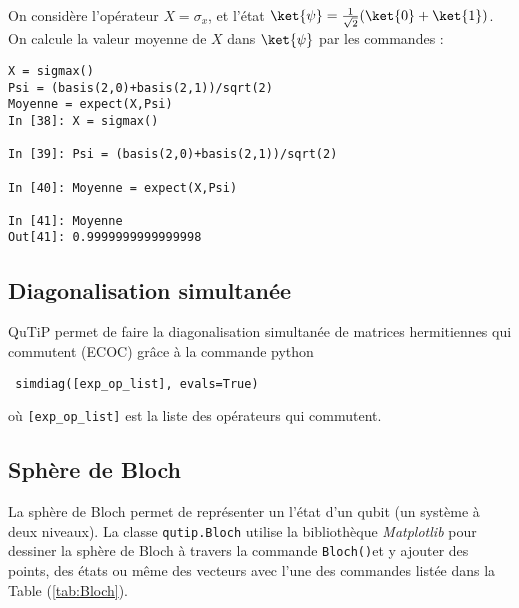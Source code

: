 \begin{example}
On considère l'opérateur $X=\sigma_x$, et l'état 
$\ket{\psi}=\frac{1}{\sqrt{2}}(\ket{0}+\ket{1})$. On calcule la valeur moyenne 
de $X$ dans $\ket{\psi}$ par les commandes :
\end{example}
\begin{lstlisting}
X = sigmax()
Psi = (basis(2,0)+basis(2,1))/sqrt(2)
Moyenne = expect(X,Psi)
In [38]: X = sigmax()

In [39]: Psi = (basis(2,0)+basis(2,1))/sqrt(2)

In [40]: Moyenne = expect(X,Psi)

In [41]: Moyenne
Out[41]: 0.9999999999999998
\end{lstlisting}

\subsection{Diagonalisation simultanée}

QuTiP permet de faire la diagonalisation simultanée de matrices hermitiennes 
qui commutent (ECOC) grâce à la commande python
\begin{lstlisting}
 simdiag([exp_op_list], evals=True)
\end{lstlisting}
où \texttt{[exp\_op\_list]} est la liste des opérateurs qui commutent.

\subsection{Sphère de Bloch}
La sphère de Bloch permet de représenter un l'état d'un qubit (un système à 
deux niveaux). La classe \texttt{qutip.Bloch} utilise la bibliothèque
\emph{Matplotlib} pour dessiner la sphère de Bloch à travers la commande 
\texttt{Bloch()}et y ajouter des points, des états ou même des vecteurs avec 
l'une des commandes listée dans la Table (\ref{tab:Bloch}).

